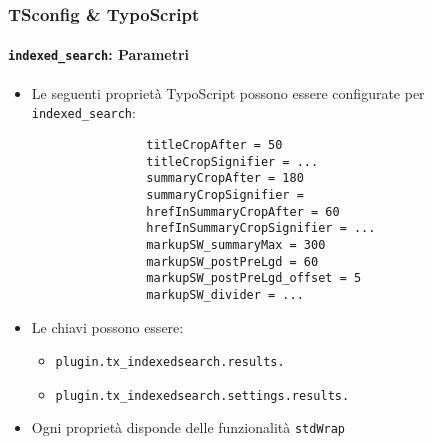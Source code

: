 \begin{frame}[fragile]
	\frametitle{TSconfig \& TypoScript}
	\framesubtitle{\texttt{indexed\_search}: Parametri}

	\lstset{basicstyle=\tiny\ttfamily}

	\begin{itemize}
		\item Le seguenti proprietà TypoScript possono essere configurate per \texttt{indexed\_search}:

			\begin{lstlisting}
				titleCropAfter = 50
				titleCropSignifier = ...
				summaryCropAfter = 180
				summaryCropSignifier =
				hrefInSummaryCropAfter = 60
				hrefInSummaryCropSignifier = ...
				markupSW_summaryMax = 300
				markupSW_postPreLgd = 60
				markupSW_postPreLgd_offset = 5
				markupSW_divider = ...
			\end{lstlisting}

		\item Le chiavi possono essere:
			\begin{itemize}
				\item \texttt{plugin.tx\_indexedsearch.results.}
				\item \texttt{plugin.tx\_indexedsearch.settings.results.}
			\end{itemize}

		\item Ogni proprietà disponde delle funzionalità \texttt{stdWrap}

	\end{itemize}

\end{frame}

